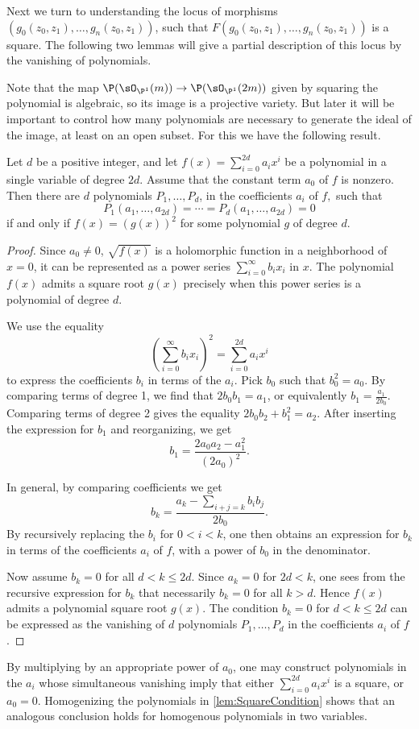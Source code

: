 Next we turn to understanding the locus of morphisms  $(g_0(z_0,z_1),\dots,g_n(z_0,z_1))$, such that $F(g_0(z_0,z_1),\dots,g_n(z_0,z_1))$ is a square. The following two lemmas will give a partial description of this locus by the vanishing of polynomials.

Note that the map $\P(\sO_{\P^1}(m)) \to \P(\sO_{\P^1}(2m))$ given by squaring the polynomial is algebraic, so its image is a projective variety. But later it will  be important to control how many polynomials are necessary to generate the ideal of the image, at least on an open subset. For this we have the following result.

\begin{lemma}
	\label{lem:SquareCondition}
  Let $d$ be a positive integer, and let $f(x) = \sum_{i=0}^{2d}a_ix^i$ be a polynomial in a single variable of degree $2d$. Assume that the constant term $a_0$ of $f$ is nonzero. Then there are $d$ polynomials $P_1,\dots,P_d$, in the coefficients $a_i$ of $f,$ such that
\[P_1(a_1,\dots,a_{2d}) = \cdots = P_d(a_1,\dots,a_{2d}) = 0\]
if and only if $f(x) = (g(x))^2$ for some polynomial $g$ of degree $d$.
\end{lemma}
\begin{proof}
  Since $a_0 \neq 0$, $\sqrt{f(x)}$ is a holomorphic function in a neighborhood of $x=0$, it can be represented as a power series $\sum_{i=0}^\infty b_ix_i$ in $x$. The polynomial $f(x)$ admits a square root $g(x)$ precisely when this power series is a polynomial of degree $d$.

We use the equality
\[(\sum_{i=0}^\infty b_ix_i)^2 = \sum_{i=0}^{2d}a_ix^i \]
to express the coefficients $b_i$ in terms of the $a_i$. Pick $b_0$ such that $b_0^2 = a_0$. By comparing terms of degree 1, we find that $2b_0b_1 = a_1$, or equivalently $b_1 = \frac{a_1}{2b_0}$. Comparing terms of degree 2 gives the equality $2b_0b_2 + b_1^2 = a_2$. After inserting the expression for $b_1$ and reorganizing, we get
\[b_1 = \frac{2a_0a_2 - a_1^2}{(2a_0)^2}.\]

In general, by comparing coefficients we get
\[ b_k = \frac{a_k - \sum_{i+j = k}b_ib_j}{2b_0}.\]
By recursively replacing the $b_i$ for $0<i<k$, one then obtains an expression for $b_k$ in terms of the coefficients $a_i$ of $f$, with a power of $b_0$ in the denominator.

Now assume $b_k = 0$ for all $d < k \leq 2d$. Since $a_k = 0$ for $2d<k$, one sees from the recursive expression for $b_k$ that necessarily $b_k=0$ for all $k>d$. Hence $f(x)$ admits a polynomial square root $g(x)$. The condition $b_k = 0$ for $d<k\leq 2d$ can be expressed as the vanishing of $d$ polynomials $P_1,\dots,P_d$ in the coefficients $a_i$ of $f$.
\end{proof}
\begin{remark}
  By multiplying by an appropriate power of $a_0$, one may construct polynomials in the $a_i$ whose simultaneous vanishing imply that either $\sum_{i=0}^{2d}a_ix^i$ is a square, or $a_0 = 0$. Homogenizing the polynomials in \cref{lem:SquareCondition} shows that an analogous conclusion holds for homogenous polynomials in two variables.
\end{remark}


